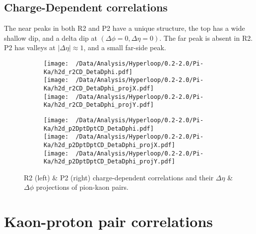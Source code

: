 \documentclass[12pt,a4paper,twoside]{report}
\begin{document}
\subsection{Charge-Dependent correlations}
The near peaks in both R2 and P2 have a unique structure, the top has a wide shallow dip, and a delta dip at $(\Delta\phi=0,\Delta\eta=0)$. The far peak is absent in R2. P2 has valleys at $|\Delta\eta|\approx1$, and a small far-side peak.
\begin{figure}[H]
	\begin{subfigure}{0.49\linewidth}
		\texttt{[image: ~/Data/Analysis/Hyperloop/0.2-2.0/Pi-Ka/h2d\_r2CD\_DetaDphi.pdf]}\\
		\texttt{[image: ~/Data/Analysis/Hyperloop/0.2-2.0/Pi-Ka/h2d\_r2CD\_DetaDphi\_projX.pdf]}\\
		\texttt{[image: ~/Data/Analysis/Hyperloop/0.2-2.0/Pi-Ka/h2d\_r2CD\_DetaDphi\_projY.pdf]}\\
	\end{subfigure}
	\begin{subfigure}{0.49\linewidth}
		\texttt{[image: ~/Data/Analysis/Hyperloop/0.2-2.0/Pi-Ka/h2d\_p2DptDptCD\_DetaDphi.pdf]}\\
		\texttt{[image: ~/Data/Analysis/Hyperloop/0.2-2.0/Pi-Ka/h2d\_p2DptDptCD\_DetaDphi\_projX.pdf]}\\
		\texttt{[image: ~/Data/Analysis/Hyperloop/0.2-2.0/Pi-Ka/h2d\_p2DptDptCD\_DetaDphi\_projY.pdf]}\\
	\end{subfigure}
	\caption{R2 (left) \& P2 (right) charge-dependent correlations and their $\Delta\eta$ \& $\Delta\phi$ projections of pion-kaon pairs.}
\end{figure}
\section{Kaon-proton pair correlations}
\end{document}
